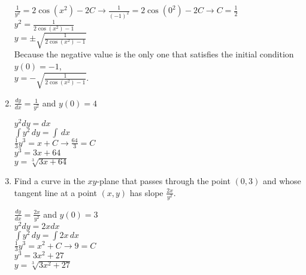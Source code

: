 \documentclass[10pt,letterpaper]{report}
\begin{document}
\begin{enumerate}
    $\frac{1}{y^{2}}=2\cos{\left(x^{2}\right)}-2C\rightarrow \frac{1}{\left(-1\right)^{2}}=2\cos{\left(0^{2}\right)}-2C\rightarrow C=\frac{1}{2}$ \\
    
    $y^{2}=\frac{1}{2\cos{\left(x^{2}\right)}-1}$ \\
    
    $y=\pm\sqrt{\frac{1}{2\cos{\left(x^{2}\right)}-1}}$ \\
    
    Because the negative value is the only one that satisfies the initial condition $y(0)=-1$, \\ $y=-\sqrt{\frac{1}{2\cos{\left(x^{2}\right)}-1}}$. \\
    
  \item{$\frac{dy}{dx}=\frac{1}{y^{2}}$ and $y(0)=4$ \\} 
  
    $y^{2}dy=dx$ \\
    
    $\int{y^{2}}\,dy=\int{}\,dx$ \\
    
    $\frac{1}{3}y^{3}=x+C\rightarrow \frac{64}{3}=C$ \\
    
    $y^{3}=3x+64$ \\
    
    $y=\sqrt[3]{3x+64}$ \\
    
    \pagebreak
    
  \item{Find a curve in the $xy$-plane that passes through the point $(0,3)$ and whose tangent line at a point $(x,y)$ has slope $\frac{2x}{y^{2}}$. \\}
  
    $\frac{dy}{dx}=\frac{2x}{y^{2}}$ and $y(0)=3$ \\
    
    $y^{2}dy=2xdx$ \\
    
    $\int{y^{2}}\,dy=\int{2x}\,dx$ \\
    
    $\frac{1}{3}y^{3}=x^{2}+C\rightarrow 9=C$ \\
    
    $y^{3}=3x^{2}+27$ \\
    
    $y=\sqrt[3]{3x^{2}+27}$ \\
    

\end{enumerate}
\end{document}
